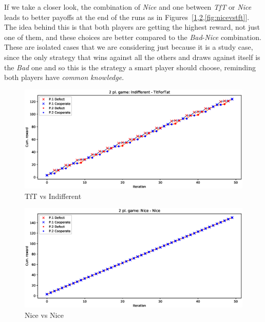 \documentclass[journal,a4paper,10pt,twoside]{IEEEtran} %
\begin{document}
If we take a closer look, the combination of \textit{Nice} and one between \textit{TfT} or \textit{Nice} leads to better payoffs at the end of the runs as in Figures~[\ref{fig:tftvsindiff},\ref{fig:nicevsnice},\ref{fig:nicevstft}]. The idea behind this is that both players are getting the highest reward, not just one of them, and these choices are better compared to the \textit{Bad}-\textit{Nice} combination.
These are isolated cases that we are considering just because it is a study case, since the only strategy that wins against all the others and draws against itself is the \textit{Bad} one and so this is the strategy a smart player should choose, reminding both players have \textit{common knowledge}.

\begin{figure}[!ht]
    \centering
    \includegraphics[width=1\columnwidth]{../img/ipd2p/ipd2p-rewards-Indifferent-TitForTat}
    \caption{TfT vs Indifferent}
    \label{fig:tftvsindiff}
\end{figure}

\begin{figure}[!ht]
    \centering
    \includegraphics[width=1\columnwidth]{../img/ipd2p/ipd2p-rewards-Nice-Nice}
    \caption{Nice vs Nice}
    \label{fig:nicevsnice}
\end{figure}
\end{document}
